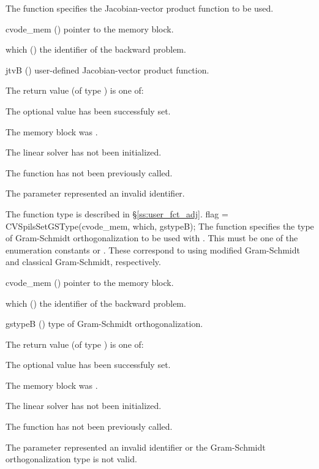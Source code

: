 {
  The function  specifies the Jacobian-vector 
  product function to be used.
}
{
  \begin{args}
  \item[cvode\_mem] ()
    pointer to the {\cvodes} memory block.
  \item[which] ()
    the identifier of the backward problem.
  \item[jtvB] ()
    user-defined Jacobian-vector product function.
  \end{args}
}
{
  The return value  (of type ) is one of:
  \begin{args}
  \item[\Id{CVSPILS\_SUCCESS}] 
    The optional value has been successfuly set.
  \item[\Id{CVSPILS\_MEM\_NULL}]
    The  memory block was .
  \item[\Id{CVSPILS\_LMEM\_NULL}]
    The {\cvspils} linear solver has not been initialized.
  \item[\Id{CVSPILS\_NO\_ADJ}]
    The function  has not been previously called.
  \item[\Id{CVSPILS\_ILL\_INPUT}]
    The parameter  represented an invalid identifier.
  \end{args}
}
{
  The function type  is described in \S\ref{ss:user_fct_adj}.
}
{
  flag = CVSpilsSetGSType(cvode\_mem, which, gstypeB);
}
{
  The function  specifies the type of
  Gram-Schmidt orthogonalization to be used with {\cvspgmr}.
  This must be one of the enumeration constants 
  or . These correspond to using modified Gram-Schmidt 
  and classical Gram-Schmidt, respectively. 
}
{
  \begin{args}[gstypeB]
  \item[cvode\_mem] ()
    pointer to the {\cvodes} memory block.
  \item[which] ()
    the identifier of the backward problem.
  \item[gstypeB] ()
    type of Gram-Schmidt orthogonalization.
  \end{args}
}
{
  The return value  (of type ) is one of:
  \begin{args}
  \item[\Id{CVSPILS\_SUCCESS}] 
    The optional value has been successfuly set.
  \item[\Id{CVSPILS\_MEM\_NULL}]
    The  memory block was .
  \item[\Id{CVSPILS\_LMEM\_NULL}]
    The {\cvspils} linear solver has not been initialized.
  \item[\Id{CVSPILS\_NO\_ADJ}]
    The function  has not been previously called.
  \item[\Id{CVSPILS\_ILL\_INPUT}]
    The parameter  represented an invalid identifier or the 
    Gram-Schmidt orthogonalization type  is not valid.
  \end{args}
}
